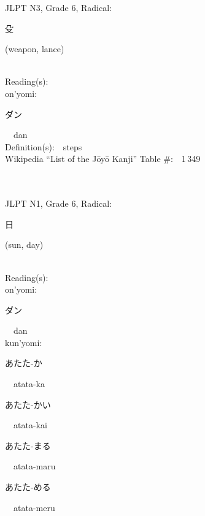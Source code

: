 \begin{multicols}{2}
{JLPT N3, Grade 6, Radical:\ \ {\begin{CJK}{UTF8}{min} 殳 \end{CJK}} (weapon, lance) } \\
Reading(s):\ \ \\
{\hspace*{1em}}on'yomi:\ \ \\
{\hspace*{2em}}{\begin{CJK}{UTF8}{min} ダン \end{CJK}}\ \ dan\ \ \\
Definition(s):\ \ steps \\
Wikipedia ``List of the J\=oy\=o Kanji'' Table \#:\ \ 1\,349 \\
\ \ \\
{\fontsize{34pt}{40pt}  }\ \ \\  %
{JLPT N1, Grade 6, Radical:\ \ {\begin{CJK}{UTF8}{min} 日 \end{CJK}} (sun, day) } \\
Reading(s):\ \ \\
{\hspace*{1em}}on'yomi:\ \ \\
{\hspace*{2em}}{\begin{CJK}{UTF8}{min} ダン \end{CJK}}\ \ dan\ \ \\
{\hspace*{1em}}kun'yomi:\ \ \\
{\hspace*{2em}}{\begin{CJK}{UTF8}{min} あたた-か \end{CJK}}\ \ atata-ka\ \ \\
{\hspace*{2em}}{\begin{CJK}{UTF8}{min} あたた-かい \end{CJK}}\ \ atata-kai\ \ \\
{\hspace*{2em}}{\begin{CJK}{UTF8}{min} あたた-まる \end{CJK}}\ \ atata-maru\ \ \\
{\hspace*{2em}}{\begin{CJK}{UTF8}{min} あたた-める \end{CJK}}\ \ atata-meru\ \ \\

\end{multicols}
